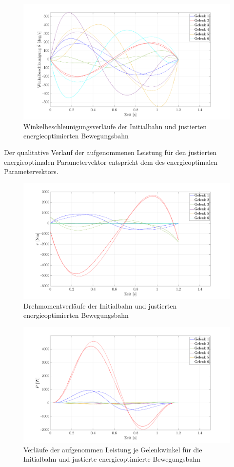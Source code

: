 %
\begin{figure}[tbph]
	\centering
	\includegraphics[width=1\linewidth]{images/Optimierungsergebnisse_up/accoptfinal}
	\caption{Winkelbeschleunigungsverläufe der Initialbahn und justierten energieoptimierten Bewegungsbahn}
	\label{fig:accoptfinal}
\end{figure}
%
Der qualitative Verlauf der aufgenommenen Leistung für den justierten energieoptimalen Parametervektor entspricht dem des energieoptimalen Parametervektors. 
%
\begin{figure}[tbph]
	\centering
	\includegraphics[width=1\linewidth]{images/Optimierungsergebnisse_up/tauoptfinal}
	\caption{Drehmomentverläufe der Initialbahn und justierten energieoptimierten Bewegungsbahn}
	\label{fig:tauoptfinal}
\end{figure}
%
\begin{figure}[tbph]
	\centering
	\includegraphics[width=1\linewidth]{images/Optimierungsergebnisse_up/poptfinal}
	\caption{Verläufe der aufgenommen Leistung je Gelenkwinkel für die Initialbahn und justierte energieoptimierte Bewegungsbahn}
	\label{fig:poptfinal}
\end{figure}
